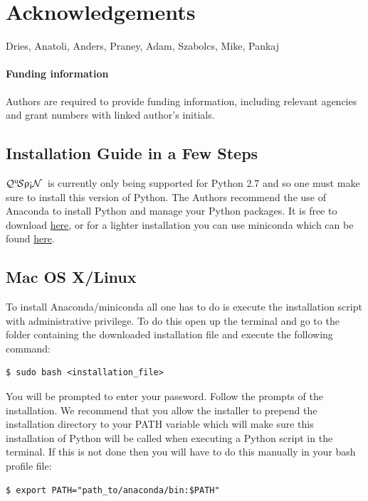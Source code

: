 \documentclass{SciPost}
\newcommand\0{\scalebox{-1}[1]{0}}
\let\svttfamily\ttfamily
\renewcommand\ttfamily{\svttfamily\catcode`0=\active }
\newcommand{\qspin}{$\mathcal{Q}^{\mathrm{u}}\!\mathcal{S}\uprho\mathrm{\text{\textexclamdown}}\mathcal{N}$}
\begin{document}
\section*{Acknowledgements}
Dries, Anatoli, Anders, Praney, Adam, Szabolcs, Mike, Pankaj

\paragraph{Funding information}
Authors are required to provide funding information, including relevant agencies and grant numbers with linked author's initials.


\begin{appendix}

\section{Installation Guide in a Few Steps}
\label{app:install}

\qspin\ is currently only being supported for Python 2.7 and so one must make sure to install this version of Python. The Authors recommend the use of Anaconda to install Python and manage your Python packages. It is free to download \href{https://www.continuum.io/downloads}{here}, or for a lighter installation you can use miniconda which can be found \href{http://conda.pydata.org/miniconda.html}{here}. 

\subsection{Mac OS X/Linux}
To install Anaconda/miniconda all one has to do is execute the installation script with administrative privilege. To do this open up the terminal and go to the folder containing the downloaded installation file and execute the following command: 
\begin{lstlisting}[numbers=none,keywordstyle=\ttfamily]
$ sudo bash <installation_file>
\end{lstlisting}
You will be prompted to enter your password. Follow the prompts of the installation. We recommend that you allow the installer to prepend the installation directory to your PATH variable which will make sure this installation of Python will be called when executing a Python script in the terminal. If this is not done then you will have to do this manually in your bash profile file:
\begin{lstlisting}[numbers=none,keywordstyle=\ttfamily]
$ export PATH="path_to/anaconda/bin:$PATH"
\end{lstlisting}


\end{appendix}
\end{document}
